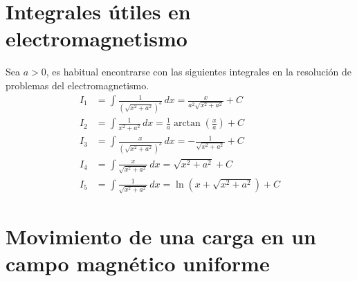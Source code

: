  \begin{appendix}
 \renewcommand{\theHchapter}{A\arabic{chapter}}
\renewcommand{\theHsection}{A\arabic{section}}
\renewcommand{\theHsubsection}{A\arabic{subsection}}

\chapter{Integrales útiles en electromagnetismo} \label{Integrales-Utiles}

Sea $a > 0$, es habitual encontrarse con las siguientes integrales en la resolución de problemas del electromagnetismo.
\begin{align}
    I_1 &= \int \frac{1}{(\sqrt{x^2+a^2})^3} \,dx = \frac{x}{a^2 \sqrt{x^2+a^2}} + C \label{A-I1}\\
    I_2 &= \int \frac{1}{x^2+a^2} \,dx = \frac{1}{a} \arctan{\left( \frac{x}{a}\right)} + C  \label{A-I2}\\
    I_3 &= \int \frac{x}{(\sqrt{x^2+a^2})^3} \,dx = - \frac{1}{\sqrt{x^2+a^2}} + C  \label{A-I3}\\
    I_4 &= \int \frac{x}{\sqrt{x^2+a^2}} \,dx = \sqrt{x^2+a^2} + C \label{A-I4} \\
    I_5 &= \int \frac{1}{\sqrt{x^2+a^2} } \,dx = \ln(x+\sqrt{x^2+a^2}) + C \label{A-I5}
\end{align}

\chapter{Movimiento de una carga en un campo magnético uniforme} \label{Mov-B-cte}

\end{appendix}

